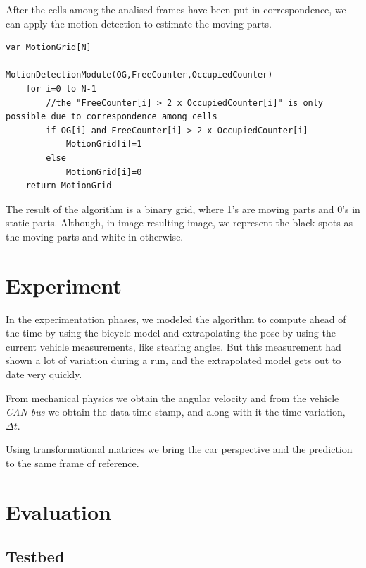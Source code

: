 After the cells among the analised frames have been put in correspondence, we can apply the motion detection to estimate the moving parts.

\begin{lstlisting}[title={Transformation},label=al:transformation,caption={Previous grid transformation}]
var	MotionGrid[N]

MotionDetectionModule(OG,FreeCounter,OccupiedCounter)
	for i=0 to N-1
		//the "FreeCounter[i] > 2 x OccupiedCounter[i]" is only possible due to correspondence among cells
		if OG[i] and FreeCounter[i] > 2 x OccupiedCounter[i]
			MotionGrid[i]=1
		else
			MotionGrid[i]=0
	return MotionGrid
\end{lstlisting}

The result of the algorithm is a binary grid, where 1's are moving parts and 0's in static parts. Although, in image resulting image, we represent the black spots as the moving parts and white in otherwise.

\section{Experiment}

In the experimentation phases, we modeled the algorithm to compute ahead of the time by using the bicycle model and extrapolating the pose by using the current vehicle measurements, like stearing angles. But this measurement had shown a lot of variation during a run, and the extrapolated model gets out to date very quickly.

From mechanical physics we obtain the angular velocity and from the vehicle \emph{CAN bus} we obtain the data time stamp, and along with it the time variation, $\Delta t$.

Using transformational matrices we bring the car perspective \cite{iyengar1991autonomous} and the prediction to the same frame of reference.

\section{Evaluation}


\subsection{Testbed}
\label{sec:testbed}

